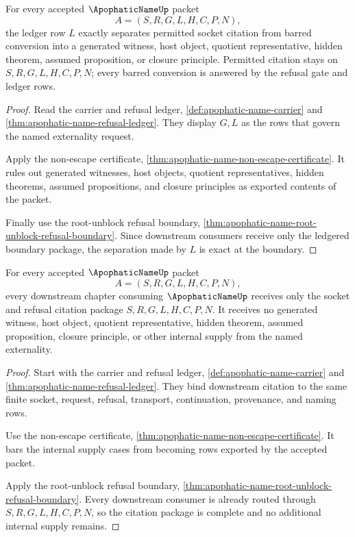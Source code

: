 \begin{theorem}
\label{thm:apophatic-name-boundary-ledger-exactness}
For every accepted $\ApophaticNameUp$ packet
$$
A=(S,R,G,L,H,C,P,N),
$$
the ledger row $L$ exactly separates permitted socket citation from barred conversion into a generated witness, host object, quotient representative, hidden theorem, assumed proposition, or closure principle. Permitted citation stays on $S,R,G,L,H,C,P,N$; every barred conversion is answered by the refusal gate and ledger rows.
\end{theorem}
\begin{proof}
Read the carrier and refusal ledger, \autoref{def:apophatic-name-carrier} and \autoref{thm:apophatic-name-refusal-ledger}. They display $G,L$ as the rows that govern the named externality request.

Apply the non-escape certificate, \autoref{thm:apophatic-name-non-escape-certificate}. It rules out generated witnesses, host objects, quotient representatives, hidden theorems, assumed propositions, and closure principles as exported contents of the packet.

Finally use the root-unblock refusal boundary, \autoref{thm:apophatic-name-root-unblock-refusal-boundary}. Since downstream consumers receive only the ledgered boundary package, the separation made by $L$ is exact at the boundary.
\end{proof}

\begin{theorem}
\label{thm:apophatic-name-downstream-socket-citation-completeness}
For every accepted $\ApophaticNameUp$ packet
$$
A=(S,R,G,L,H,C,P,N),
$$
every downstream chapter consuming $\ApophaticNameUp$ receives only the socket and refusal citation package $S,R,G,L,H,C,P,N$. It receives no generated witness, host object, quotient representative, hidden theorem, assumed proposition, closure principle, or other internal supply from the named externality.
\end{theorem}
\begin{proof}
Start with the carrier and refusal ledger, \autoref{def:apophatic-name-carrier} and \autoref{thm:apophatic-name-refusal-ledger}. They bind downstream citation to the same finite socket, request, refusal, transport, continuation, provenance, and naming rows.

Use the non-escape certificate, \autoref{thm:apophatic-name-non-escape-certificate}. It bars the internal supply cases from becoming rows exported by the accepted packet.

Apply the root-unblock refusal boundary, \autoref{thm:apophatic-name-root-unblock-refusal-boundary}. Every downstream consumer is already routed through $S,R,G,L,H,C,P,N$, so the citation package is complete and no additional internal supply remains.
\end{proof}

